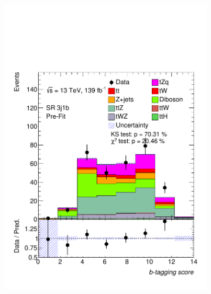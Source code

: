 \begin{figure}[!h]
\begin{subfigure}[b]{0.33\linewidth}
    \includegraphics[width=\linewidth]{ubonn-thesis/Chapters/Chapters_06/Figure/Input_distribution/SR_3j1b_btag.pdf} 
  \end{subfigure}
  \centering
  \begin{subfigure}[b]{0.33\linewidth}
    \centering

\end{subfigure}
\end{figure}
